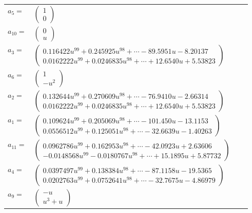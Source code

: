 \documentclass[1p]{elsarticle_modified}
\theoremstyle{definition}
\begin{document}
\begin{tabular}{m{7pt} m{180pt} m{7pt} m{180pt} }
\flushright $a_{5}=$&$\begin{pmatrix}1\\0\end{pmatrix}$ \\
\flushright $a_{10}=$&$\begin{pmatrix}0\\u\end{pmatrix}$ \\
\flushright $a_{3}=$&$\begin{pmatrix}0.116422 u^{99}+0.245925 u^{98}+\cdots-89.5951 u-8.20137\\0.0162222 u^{99}+0.0246835 u^{98}+\cdots+12.6540 u+5.53823\end{pmatrix}$ \\
\flushright $a_{6}=$&$\begin{pmatrix}1\\- u^2\end{pmatrix}$ \\
\flushright $a_{2}=$&$\begin{pmatrix}0.132644 u^{99}+0.270609 u^{98}+\cdots-76.9410 u-2.66314\\0.0162222 u^{99}+0.0246835 u^{98}+\cdots+12.6540 u+5.53823\end{pmatrix}$ \\
\flushright $a_{1}=$&$\begin{pmatrix}0.109624 u^{99}+0.205069 u^{98}+\cdots-101.450 u-13.1153\\0.0556512 u^{99}+0.125051 u^{98}+\cdots-32.6639 u-1.40263\end{pmatrix}$ \\
\flushright $a_{11}=$&$\begin{pmatrix}0.0962786 u^{99}+0.162953 u^{98}+\cdots-42.0923 u+2.63606\\-0.0148568 u^{99}-0.0180767 u^{98}+\cdots+15.1895 u+5.87732\end{pmatrix}$ \\
\flushright $a_{4}=$&$\begin{pmatrix}0.0397497 u^{99}+0.138384 u^{98}+\cdots-87.1158 u-19.5365\\0.0202763 u^{99}+0.0752641 u^{98}+\cdots-32.7675 u-4.86979\end{pmatrix}$ \\
\flushright $a_{9}=$&$\begin{pmatrix}- u\\u^3+u\end{pmatrix}$ \\

\end{tabular}
\end{document}
